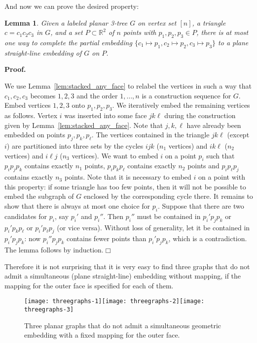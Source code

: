 \documentclass[11pt]{article}
\newtheorem{lemma}[equation]{Lemma}
\newcommand{\qed}{\hfill\ensuremath{\Box}}
\newenvironment{proof}{\noindent\textbf{Proof.}
}{\par\medskip}
\newcommand{\R}{\ensuremath{\mathds R}}
\newcommand{\figscale}{1.1}
\begin{document}
And now we can prove the desired property:
\begin{lemma}
  \label{lem:stacked_unique}
  Given a labeled planar 3-tree $G$ on vertex set $[n]$, a triangle
  $c=c_1c_2c_3$ in $G$, and a set $P\subset \R^2$ of $n$ points with
  $p_1,p_2,p_3\in P$, there is at most one way to complete the partial
  embedding $\{c_1\mapsto p_1, c_2\mapsto p_2, c_3\mapsto p_3\}$ to a plane
  straight-line embedding of $G$ on $P$.
\end{lemma}
\begin{proof}
  We use Lemma~\ref{lem:stacked_any_face} to relabel the vertices in such a way
  that $c_1,c_2,c_3$ becomes $1,2,3$ and the order $1,\dots,n$ is a construction
  sequence for $G$. Embed vertices $1,2,3$ onto $p_1,p_2,p_3$. We iteratively
  embed the remaining vertices as follows. Vertex $i$ was inserted into some
  face $jk\ell$ during the construction given by
  Lemma~\ref{lem:stacked_any_face}. Note that $j,k,\ell$ have already been
  embedded on points $p_j,p_k,p_\ell$. The vertices contained in the triangle
  $jk\ell$ (except $i$) are partitioned into three sets by the cycles $ijk$
  ($n_1$ vertices) and $ik\ell$ ($n_2$ vertices) and $i\ell j$ ($n_3$
  vertices). We want to embed $i$ on a point $p_i$ such that $p_ip_jp_k$
  contains exactly $n_1$ points, $p_ip_kp_\ell$ contains exactly $n_2$ points
  and $p_ip_{\ell}p_j$ contains exactly $n_3$ points. Note that it is necessary
  to embed $i$ on a point with this property: if some triangle has too few
  points, then it will not be possible to embed the subgraph of $G$ enclosed by
  the corresponding cycle there. It remains to show that there is always at most
  one choice for $p_i$. Suppose that there are two candidates for $p_i$, say
  $p_i'$ and $p_i''$. Then $p_i''$ must be contained in $p_i'p_jp_k$ or
  $p_i'p_kp_\ell$ or $p_i'p_{\ell}p_j$ (or vice versa). Without loss of
  generality, let it be contained in $p_i'p_jp_k$: now $p_i''p_jp_k$ contains
  fewer points than $p_i'p_jp_k$, which is a contradiction. The lemma follows by
  induction.\qed
\end{proof}
Therefore it is not surprising that it is very easy to find three graphs that do
not admit a simultaneous (plane straight-line) embedding without mapping, if the
mapping for the outer face is specified for each of them.
\begin{figure}[htbp]
  \hfil \texttt{[image: threegraphs-1]}\hfil \texttt{[image: threegraphs-2]}\hfil \texttt{[image: threegraphs-3]}\hfil \caption{\label{fig:three}Three planar graphs that do not admit a simultaneous
    geometric embedding with a fixed mapping for the outer face.}
\end{figure}
\end{document}
